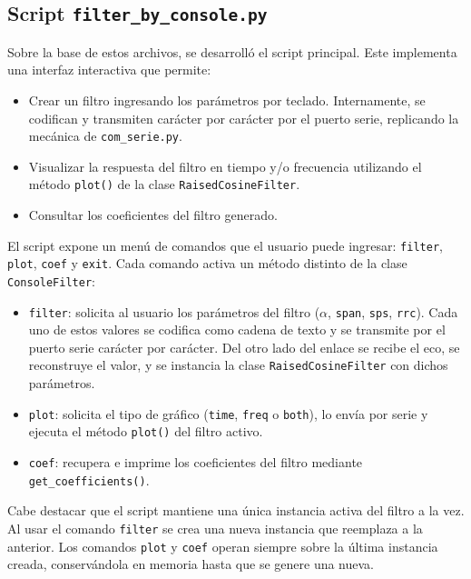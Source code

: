 \documentclass[11pt,a4paper]{article}
\begin{document}
\subsection{Script \texttt{filter\_by\_console.py}}

Sobre la base de estos archivos, se desarrolló el script principal. Este
implementa una interfaz interactiva que permite:

\begin{itemize}
    \item Crear un filtro ingresando los parámetros por teclado. Internamente, se
          codifican y transmiten carácter por carácter por el puerto serie, replicando la
          mecánica de \texttt{com\_serie.py}.
    \item Visualizar la respuesta del filtro en tiempo y/o frecuencia utilizando el
          método \texttt{plot()} de la clase \texttt{RaisedCosineFilter}.
    \item Consultar los coeficientes del filtro generado.
\end{itemize}

El script expone un menú de comandos que el usuario puede ingresar:
\texttt{filter}, \texttt{plot}, \texttt{coef} y \texttt{exit}. Cada comando
activa un método distinto de la clase \texttt{ConsoleFilter}:

\begin{itemize}
    \item \texttt{filter}: solicita al usuario los parámetros del filtro
          ($\alpha$, \texttt{span}, \texttt{sps}, \texttt{rrc}). Cada uno de
          estos valores se codifica como cadena de texto y se transmite por el
          puerto serie carácter por carácter. Del otro lado del enlace se recibe el eco,
          se reconstruye el valor, y se instancia la clase
          \texttt{RaisedCosineFilter} con dichos parámetros.
    \item \texttt{plot}: solicita el tipo de gráfico (\texttt{time},
          \texttt{freq} o \texttt{both}), lo envía por serie y ejecuta el
          método \texttt{plot()} del filtro activo.
    \item \texttt{coef}: recupera e imprime los coeficientes del filtro mediante
          \verb|get_coefficients()|.
\end{itemize}

Cabe destacar que el script mantiene una única instancia activa del filtro a la
vez. Al usar el comando \texttt{filter} se crea una nueva instancia que
reemplaza a la anterior. Los comandos \texttt{plot} y \texttt{coef} operan
siempre sobre la última instancia creada, conservándola en memoria hasta que se
genere una nueva.
\end{document}
